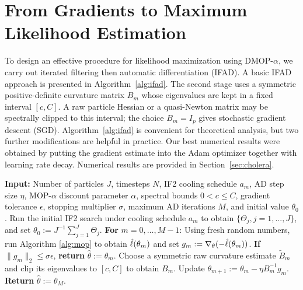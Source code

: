 \documentclass[11pt]{article}
\begin{document}
\section{From Gradients to Maximum Likelihood Estimation}

To design an effective procedure for likelihood maximization using DMOP-$\alpha$, we carry out iterated filtering then automatic differentiation (IFAD). 
A basic IFAD approach is presented in Algorithm~\ref{alg:ifad}.
The second stage uses a symmetric positive-definite curvature matrix $B_m$ whose
eigenvalues are kept in a fixed interval $[c,C]$.  A raw particle Hessian or a
quasi-Newton matrix may be spectrally clipped to this interval; the choice
$B_m=I_p$ gives stochastic gradient descent (SGD).
Algorithm~\ref{alg:ifad} is convenient for theoretical analysis, but two further modifications are helpful in practice.
Our best numerical results were obtained by putting the gradient estimate into the Adam optimizer \citep{kingma15} together with learning rate decay. 
Numerical results are provided in Section~\ref{sec:cholera}.

\begin{algorithm}[htbp!]
	\caption{IFAD}
    \label{alg:ifad}
	    \textbf{Input:} Number of particles $J$, timesteps $N$, IF2 cooling schedule $a_m$, AD step size $\eta$, MOP-$\alpha$ discount parameter $\alpha$, spectral bounds $0<c\leq C$, gradient tolerance $\epsilon$, stopping multiplier $\sigma$, maximum AD iterations $M$, and initial value $\theta_0$.\newline
        Run the initial IF2 search under cooling schedule $a_m$ to obtain $\{\Theta_j, j=1,...,J\}$, and set $\theta_0 := J^{-1}\sum_{j=1}^J \Theta_j.$\newline
		\textbf{For} $m=0,\ldots,M-1$: \newline
		\hspace*{4mm} Using fresh random numbers, run Algorithm \ref{alg:mop} to obtain $\hat{\ell}(\theta_m)$ and set $g_m := \nabla_{\theta}(-\hat{\ell}(\theta_m))$. \newline
		\hspace*{4mm} \textbf{If} $\|g_m\|_2\leq\sigma\epsilon$, \textbf{return} $\hat\theta:=\theta_m$. \newline
		\hspace*{4mm} Choose a symmetric raw curvature estimate $\widetilde B_m$ and clip its eigenvalues to $[c,C]$ to obtain $B_m$. \newline
		\hspace*{4mm} Update $\theta_{m+1} := \theta_m - \eta B_m^{-1} g_m$. \newline
		\textbf{Return} $\hat{\theta} := \theta_M.$
\end{algorithm}
\end{document}
